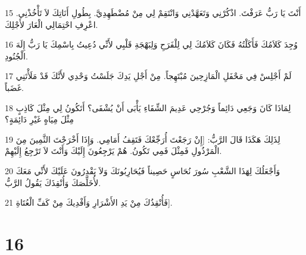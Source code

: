 \par 15 أَنْتَ يَا رَبُّ عَرَفْتَ. اذْكُرْنِي وَتَعَهَّدْنِي وَانْتَقِمْ لِي مِنْ مُضْطَهِدِيَّ. بِطُولِ أَنَاتِكَ لاَ تَأْخُذْنِي. اعْرِفِ احْتِمَالِي الْعَارَ لأَجْلِكَ.
\par 16 وُجِدَ كَلاَمُكَ فَأَكَلْتُهُ فَكَانَ كَلاَمُكَ لِي لِلْفَرَحِ وَلِبَهْجَةِ قَلْبِي لأَنِّي دُعِيتُ بِاسْمِكَ يَا رَبُّ إِلَهَ الْجُنُودِ.
\par 17 لَمْ أَجْلِسْ فِي مَحْفَلِ الْمَازِحِينَ مُبْتَهِجاً. مِنْ أَجْلِ يَدِكَ جَلَسْتُ وَحْدِي لأَنَّكَ قَدْ مَلَأْتَنِي غَضَباً.
\par 18 لِمَاذَا كَانَ وَجَعِي دَائِماً وَجُرْحِي عَدِيمَ الشِّفَاءِ يَأْبَى أَنْ يُشْفَى؟ أَتَكُونُ لِي مِثْلَ كَاذِبٍ مِثْلَ مِيَاهٍ غَيْرِ دَائِمَةٍ؟
\par 19 لِذَلِكَ هَكَذَا قَالَ الرَّبُّ: [إِنْ رَجَعْتَ أُرَجِّعْكَ فَتَقِفُ أَمَامِي. وَإِذَا أَخْرَجْتَ الثَّمِينَ مِنَ الْمَرْذُولِ فَمِثْلَ فَمِي تَكُونُ. هُمْ يَرْجِعُونَ إِلَيْكَ وَأَنْتَ لاَ تَرْجِعُ إِلَيْهِمْ.
\par 20 وَأَجْعَلُكَ لِهَذَا الشَّعْبِ سُورَ نُحَاسٍ حَصِيناً فَيُحَارِبُونَكَ وَلاَ يَقْدِرُونَ عَلَيْكَ لأَنِّي مَعَكَ لأُخَلِّصَكَ وَأُنْقِذَكَ يَقُولُ الرَّبُّ.
\par 21 فَأُنْقِذُكَ مِنْ يَدِ الأَشْرَارِ وَأَفْدِيكَ مِنْ كَفِّ الْعُتَاةِ].

\chapter{16}

